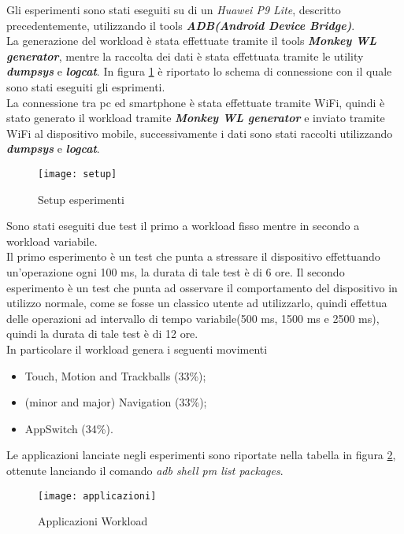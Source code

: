 Gli esperimenti sono stati eseguiti su di un \textit{Huawei P9 Lite}, descritto
precedentemente, utilizzando il tools \textit{\textbf{ADB(Android Device Bridge)}}.\\
La generazione del workload è stata effettuate tramite il tools
\textit{\textbf{Monkey WL generator}}, mentre la raccolta dei dati è stata
effettuata tramite le utility \textit{\textbf{dumpsys}} e \textit{\textbf{logcat}}.
In figura \ref{setup} è riportato lo schema di connessione con il quale sono stati
eseguiti gli esprimenti.\\
La connessione tra pc ed smartphone è stata effettuate tramite WiFi, quindi è
stato generato il workload tramite \textit{\textbf{Monkey WL generator}} e inviato
tramite WiFi al dispositivo mobile,  successivamente i dati sono stati raccolti
utilizzando  \textit{\textbf{dumpsys}} e \textit{\textbf{logcat}}.

\begin{figure}[!htbp]
  \centering
  \texttt{[image: setup]}
  \caption{Setup esperimenti}
  \label{setup}
\end{figure}

Sono stati eseguiti due test il primo a workload fisso mentre in secondo a workload
variabile.\\
Il primo esperimento è un test che punta a stressare il dispositivo effettuando
un'operazione ogni 100 ms, la durata di tale test è di 6 ore.
Il secondo esperimento è un test che punta ad osservare il comportamento del dispositivo
in utilizzo normale, come se fosse un classico utente ad utilizzarlo, quindi effettua
delle operazioni ad intervallo di tempo variabile(500 ms, 1500 ms e 2500 ms), quindi la durata di tale test è di
12 ore.\\
In particolare il workload genera i seguenti movimenti
\begin{itemize}
  \item Touch, Motion and Trackballs (33\%);
  \item (minor and major) Navigation (33\%);
  \item AppSwitch (34\%).
\end{itemize}
Le applicazioni lanciate negli esperimenti sono riportate nella tabella in figura
\ref{applicazioni}, ottenute lanciando il comando \textit{adb shell pm list
packages}.\\

\begin{figure}[!htbp]
  \centering
  \texttt{[image: applicazioni]}
  \caption{Applicazioni Workload}
  \label{applicazioni}
\end{figure}

